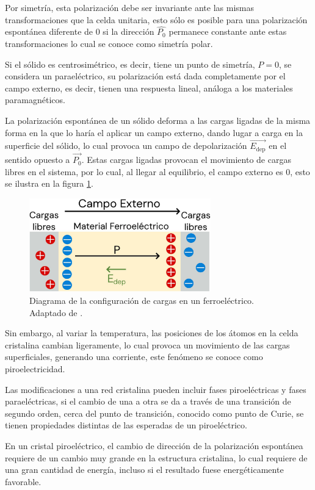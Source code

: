 \documentclass[../main.tex]{subfiles}
\begin{document}
Por simetría, esta polarización debe ser invariante ante las mismas transformaciones que la celda unitaria, esto sólo es posible para una polarización espontánea diferente de 0 si la dirección $\hat{P_{0}}$ permanece constante ante estas transformaciones lo cual se conoce como simetría polar.

Si el sólido es centrosimétrico, es decir, tiene un punto de simetría, $P=0$, se considera un paraeléctrico, su polarización está dada completamente por el campo externo, es decir, tienen una respuesta lineal, análoga a los materiales paramagnéticos.

La polarización espontánea de un sólido deforma a las cargas ligadas de la misma forma en la que lo haría el aplicar un campo externo, dando lugar a carga en la superficie del sólido, lo cual provoca un campo de depolarización $\vec{E_\text{dep}}$ en el sentido opuesto a $\vec{P_0}$. Estas cargas ligadas provocan el movimiento de cargas libres en el sistema, por lo cual, al llegar al equilibrio, el campo externo es 0, esto se ilustra en la figura \ref{fig:ferroelecdiag}.
\begin{figure}[H]
    \centering
    \includegraphics[width=0.7\textwidth]{fig/ferroelecdiag.jpg}
    \caption{Diagrama de la configuración de cargas en un ferroeléctrico. Adaptado de \cite{Qiao2021}.}
    \label{fig:ferroelecdiag}
\end{figure}
Sin embargo, al variar la temperatura, las posiciones de los átomos en la celda cristalina cambian ligeramente, lo cual provoca un movimiento de las cargas superficiales, generando una corriente, este fenómeno se conoce como piroelectricidad.

Las modificaciones a una red cristalina pueden incluir fases piroeléctricas y fases paraeléctricas, si el cambio de una a otra se da a través de una transición de segundo orden, cerca del punto de transición, conocido como punto de Curie, se tienen propiedades distintas de las esperadas de un piroeléctrico.

En un cristal piroeléctrico, el cambio de dirección de la polarización espontánea requiere de un cambio muy grande en la estructura cristalina, lo cual requiere de una gran cantidad de energía, incluso si el resultado fuese energéticamente favorable.
\end{document}
